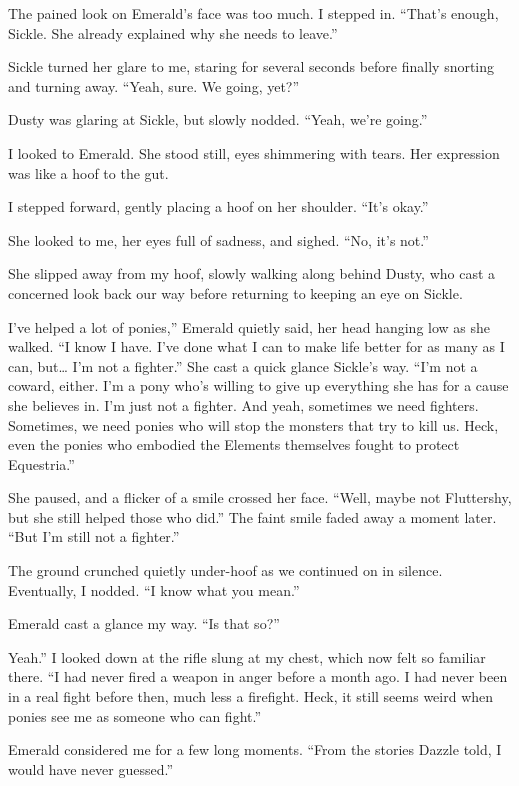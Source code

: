 The pained look on Emerald’s face was too much. I stepped in. “That’s enough, Sickle. She already explained why she needs to leave.”

Sickle turned her glare to me, staring for several seconds before finally snorting and turning away. “Yeah, sure. We going, yet?”

Dusty was glaring at Sickle, but slowly nodded. “Yeah, we’re going.”

I looked to Emerald. She stood still, eyes shimmering with tears. Her expression was like a hoof to the gut.

I stepped forward, gently placing a hoof on her shoulder. “It’s okay.”

She looked to me, her eyes full of sadness, and sighed. “No, it’s not.”

She slipped away from my hoof, slowly walking along behind Dusty, who cast a concerned look back our way before returning to keeping an eye on Sickle.

\leavevmode{}I’ve helped a lot of ponies,” Emerald quietly said, her head hanging low as she walked. “I know I have. I’ve done what I can to make life better for as many as I can, but… I’m not a fighter.” She cast a quick glance Sickle’s way. “I’m not a coward, either. I’m a pony who’s willing to give up everything she has for a cause she believes in. I’m just not a fighter. And yeah, sometimes we need fighters. Sometimes, we need ponies who will stop the monsters that try to kill us. Heck, even the ponies who embodied the Elements themselves fought to protect Equestria.”

She paused, and a flicker of a smile crossed her face. “Well, maybe not Fluttershy, but she still helped those who did.” The faint smile faded away a moment later. “But I’m still not a fighter.”

The ground crunched quietly under-hoof as we continued on in silence. Eventually, I nodded. “I know what you mean.”

Emerald cast a glance my way. “Is that so?”

\leavevmode{}Yeah.” I looked down at the rifle slung at my chest, which now felt so familiar there. “I had never fired a weapon in anger before a month ago. I had never been in a real fight before then, much less a firefight. Heck, it still seems weird when ponies see me as someone who can fight.”

Emerald considered me for a few long moments. “From the stories Dazzle told, I would have never guessed.”

